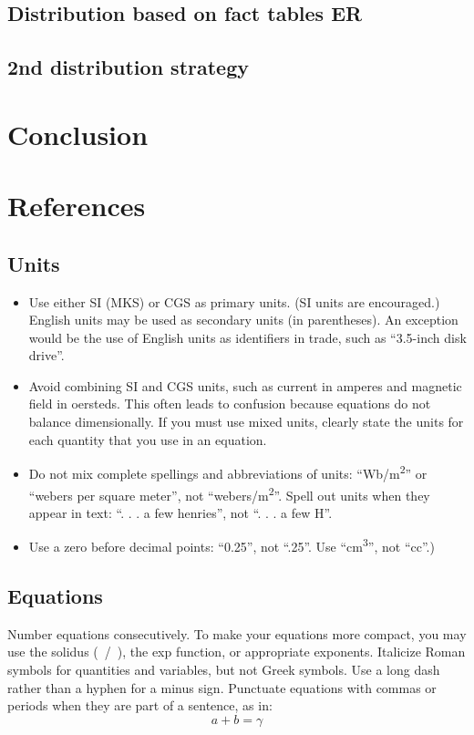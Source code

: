 \documentclass[conference]{IEEEtran}
\begin{document}

\subsection{Distribution based on fact tables ER}
\label{sec:distribution-based-on-fact-tables-er}


\subsection{2nd distribution strategy}
\label{sec:2nd-distribution-strategy}

\section{Conclusion}
\section{References}
\subsection{Units}
\begin{itemize}
    \item Use either SI (MKS) or CGS as primary units. (SI units are encouraged.) English units may be used as secondary units (in parentheses). An exception would be the use of English units as identifiers in trade, such as ``3.5-inch disk drive''.
    \item Avoid combining SI and CGS units, such as current in amperes and magnetic field in oersteds. This often leads to confusion because equations do not balance dimensionally. If you must use mixed units, clearly state the units for each quantity that you use in an equation.
    \item Do not mix complete spellings and abbreviations of units: ``Wb/m\textsuperscript{2}'' or ``webers per square meter'', not ``webers/m\textsuperscript{2}''. Spell out units when they appear in text: ``. . . a few henries'', not ``. . . a few H''.
    \item Use a zero before decimal points: ``0.25'', not ``.25''. Use ``cm\textsuperscript{3}'', not ``cc''.)
\end{itemize}

\subsection{Equations}
Number equations consecutively. To make your
equations more compact, you may use the solidus (~/~), the exp function, or
appropriate exponents. Italicize Roman symbols for quantities and variables,
but not Greek symbols. Use a long dash rather than a hyphen for a minus
sign. Punctuate equations with commas or periods when they are part of a
sentence, as in:
\begin{equation}
    a+b=\gamma\label{eq}
\end{equation}
\end{document}
